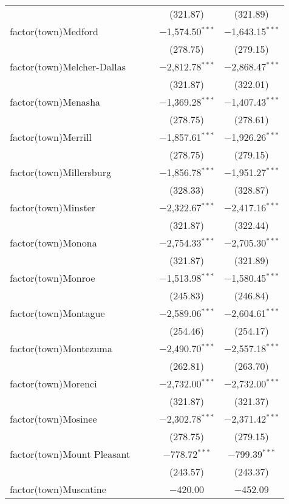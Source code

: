 \begin{table}[!htbp]
\begin{tabular}{@{\extracolsep{5pt}}lcccc}
  &  &  & (321.87) & (321.89) \\ 
  factor(town)Medford &  &  & $-$1,574.50$^{***}$ & $-$1,643.15$^{***}$ \\ 
  &  &  & (278.75) & (279.15) \\ 
  factor(town)Melcher-Dallas &  &  & $-$2,812.78$^{***}$ & $-$2,868.47$^{***}$ \\ 
  &  &  & (321.87) & (322.01) \\ 
  factor(town)Menasha &  &  & $-$1,369.28$^{***}$ & $-$1,407.43$^{***}$ \\ 
  &  &  & (278.75) & (278.61) \\ 
  factor(town)Merrill &  &  & $-$1,857.61$^{***}$ & $-$1,926.26$^{***}$ \\ 
  &  &  & (278.75) & (279.15) \\ 
  factor(town)Millersburg &  &  & $-$1,856.78$^{***}$ & $-$1,951.27$^{***}$ \\ 
  &  &  & (328.33) & (328.87) \\ 
  factor(town)Minster &  &  & $-$2,322.67$^{***}$ & $-$2,417.16$^{***}$ \\ 
  &  &  & (321.87) & (322.44) \\ 
  factor(town)Monona &  &  & $-$2,754.33$^{***}$ & $-$2,705.30$^{***}$ \\ 
  &  &  & (321.87) & (321.89) \\ 
  factor(town)Monroe &  &  & $-$1,513.98$^{***}$ & $-$1,580.45$^{***}$ \\ 
  &  &  & (245.83) & (246.84) \\ 
  factor(town)Montague &  &  & $-$2,589.06$^{***}$ & $-$2,604.61$^{***}$ \\ 
  &  &  & (254.46) & (254.17) \\ 
  factor(town)Montezuma &  &  & $-$2,490.70$^{***}$ & $-$2,557.18$^{***}$ \\ 
  &  &  & (262.81) & (263.70) \\ 
  factor(town)Morenci &  &  & $-$2,732.00$^{***}$ & $-$2,732.00$^{***}$ \\ 
  &  &  & (321.87) & (321.37) \\ 
  factor(town)Mosinee &  &  & $-$2,302.78$^{***}$ & $-$2,371.42$^{***}$ \\ 
  &  &  & (278.75) & (279.15) \\ 
  factor(town)Mount Pleasant &  &  & $-$778.72$^{***}$ & $-$799.39$^{***}$ \\ 
  &  &  & (243.57) & (243.37) \\ 
  factor(town)Muscatine &  &  & $-$420.00 & $-$452.09 \\ 

\end{tabular}
\end{table}
